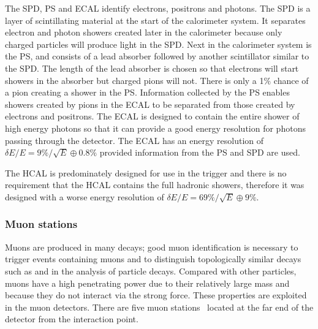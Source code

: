 The SPD, PS and ECAL identify electrons, positrons and photons. The SPD is a layer of scintillating material at the start of the calorimeter system. It separates electron and photon showers created later in the calorimeter because only charged particles will produce light in the SPD. Next in the calorimeter system is the PS, and consists of a lead absorber followed by another scintillator similar to the SPD. The length of the lead absorber is chosen so that electrons will start showers in the absorber but charged pions will not. There is only a 1$\%$ chance of a pion creating a shower in the PS. Information collected by the PS enables showers created by pions in the ECAL to be separated from those created by electrons and positrons. The ECAL is designed to contain the entire shower of high energy photons so that it can provide a good energy resolution for photons passing through the detector. The ECAL has an energy resolution of $\delta E / E = 9\%/\sqrt{E} \oplus 0.8\%$  provided information from the PS and SPD are used. 

The HCAL is predominately designed for use in the trigger and there is no requirement that the HCAL contains the full hadronic showers, therefore it was designed with a worse energy resolution of $\delta E / E = 69\% / \sqrt{E} \oplus 9\%$. 


\subsubsection{Muon stations}
\label{Muon_stations}

Muons are produced in many \bhadron decays; good muon identification is necessary to trigger events containing muons and to distinguish topologically similar decays such as \bmumu and \bdkpi in the analysis of particle decays. 
Compared with other particles, muons have a high penetrating power due to their relatively large mass and because they do not interact via the strong force. These properties are exploited in the muon detectors. There are five muon stations~\cite{Barbosa-Marinho:504326} located at the far end of the detector from the interaction point. %


